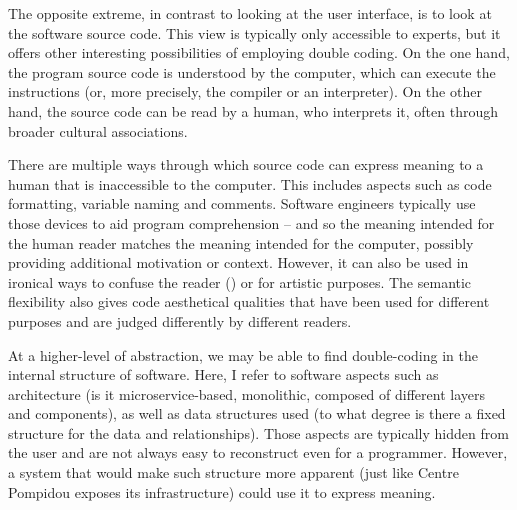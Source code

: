 The opposite extreme, in contrast to looking at the user interface, is to look at the software
source code. This view is typically only accessible to experts, but it offers other interesting
possibilities of employing double coding. On the one hand, the program source code is
understood by the computer, which can execute the instructions (or, more precisely, the
compiler or an interpreter). On the other hand, the source code can be read by a human, who
interprets it, often through broader cultural associations.

There are multiple ways through which source code can express meaning to a human that is
inaccessible to the computer. This includes aspects such as code formatting, variable naming
and comments. Software engineers typically use those devices to aid program comprehension --
and so the meaning intended for the human reader matches the meaning intended for the
computer, possibly providing additional motivation or context. However, it can also be
used in ironical ways to confuse the reader () or for artistic
purposes.
The semantic flexibility also gives code aesthetical qualities that have been used for different
purposes and are judged differently by different readers.

At a higher-level of abstraction, we may be able to find double-coding in the internal structure
of software. Here, I refer to software aspects such as architecture (is it microservice-based,
monolithic, composed of different layers and components), as well as data structures used
(to what degree is there a fixed structure for the data and relationships).
Those aspects are typically hidden from the user and are not always easy to reconstruct even for
a programmer. However, a system that would make such structure more apparent (just like Centre
Pompidou exposes its infrastructure) could use it to express meaning.

